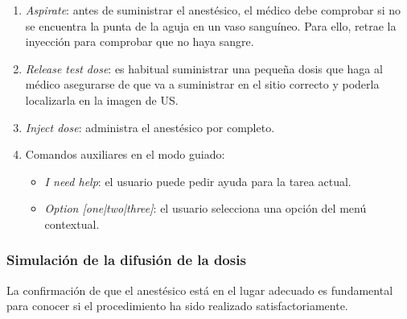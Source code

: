 \begin{enumerate}
    \item \emph{Aspirate}: antes de suministrar el anestésico, el médico debe comprobar si no se encuentra la punta de la aguja en un vaso sanguíneo. Para ello, retrae la inyección para comprobar que no haya sangre.
\item \emph{Release test dose}: es habitual suministrar una pequeña dosis que haga al médico asegurarse de que va a suministrar en el sitio correcto y poderla localizarla en la imagen de \ac{US}.
\item \emph{Inject dose}: administra el anestésico por completo.

\item Comandos auxiliares en el modo guiado:
\begin{itemize}
    \item \emph{I need help}: el usuario puede pedir ayuda para la tarea actual.
\item \emph{Option [one|two|three]}: el usuario selecciona una opción del menú contextual.

\end{itemize}

\end{enumerate}

\subsubsection{Simulación de la difusión de la dosis}
\label{course:dosis}
La confirmación de que el anestésico está en el lugar adecuado es fundamental para conocer si el procedimiento ha sido realizado satisfactoriamente. %



